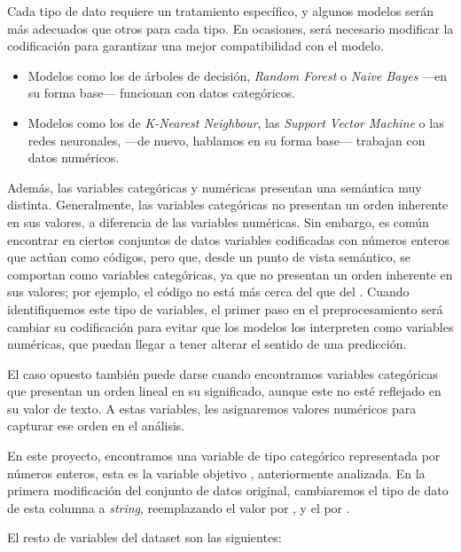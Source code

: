Cada tipo de dato requiere un tratamiento específico, y algunos modelos serán más adecuados que otros para cada tipo. En ocasiones, será necesario modificar la codificación para garantizar una mejor compatibilidad con el modelo.
\begin{itemize}
    \item Modelos como los de árboles de decisión, \textit{Random Forest} o \textit{Naive Bayes} ---en su forma base--- funcionan con datos categóricos.
    \item Modelos como los de \textit{K-Nearest Neighbour}, las \textit{Support Vector Machine} o las redes neuronales, ---de nuevo, hablamos en su forma base--- trabajan con datos numéricos.
\end{itemize}

Además, las variables categóricas y numéricas presentan una semántica muy distinta. Generalmente, las variables categóricas no presentan un orden inherente en sus valores, a diferencia de las variables numéricas. Sin embargo, es común encontrar en ciertos conjuntos de datos variables codificadas con números enteros que actúan como códigos, pero que, desde un punto de vista semántico, se comportan como variables categóricas, ya que no presentan un orden inherente en sus valores; por ejemplo, el código  no está más cerca del  que del . Cuando identifiquemos este tipo de variables, el primer paso en el preprocesamiento será cambiar su codificación para evitar que los modelos los interpreten como variables numéricas, que puedan llegar a tener alterar el sentido de una predicción.

El caso opuesto también puede darse cuando encontramos variables categóricas que presentan un orden lineal en su significado, aunque este no esté reflejado en su valor de texto. 
A estas variables, les asignaremos valores numéricos para capturar ese orden en el análisis.

En este proyecto, encontramos una variable de tipo categórico representada por números enteros, esta es la variable objetivo , anteriormente analizada. 
En la primera modificación del conjunto de datos original, cambiaremos el tipo de dato de esta columna a \textit{string}, reemplazando el valor  por , y el  por .

El resto de variables del dataset son las siguientes:

